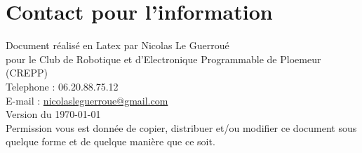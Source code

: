 
\section*{Contact pour l'information}

Document réalisé en Latex par Nicolas Le Guerroué \\
pour le Club de Robotique et d'Electronique Programmable de Ploemeur (CREPP) \\
Telephone : 06.20.88.75.12 \\
E-mail : \href{mailto:nicolasleguerroue@gmail.com}{nicolasleguerroue@gmail.com} \\
Version du \today \\

Permission vous est donnée de copier, distribuer et/ou modifier ce document sous quelque forme et de quelque manière que ce soit.



